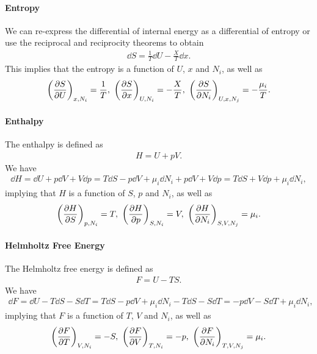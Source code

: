 \paragraph{Entropy}
We can re-express the differential of internal energy as a differential of entropy or use the reciprocal and reciprocity theorems to obtain
\begin{align*}
	\dd{S} = \frac{1}{T}\dd{U} - \frac{X}{T}\dd{x}.
\end{align*}
This implies that the entropy is a function of $U$, $x$ and $N_{i}$, as well as
\begin{align*}
	\left(\pdv{S}{U}\right)_{x, N_{i}} = \frac{1}{T},\ \left(\pdv{S}{x}\right)_{U, N_{i}} = -\frac{X}{T},\ \left(\pdv{S}{N_{i}}\right)_{U, x, N_{j}} = -\frac{\mu_{i}}{T}.
\end{align*}

\paragraph{Enthalpy}
The enthalpy is defined as 
\begin{align*}
	H = U + pV.
\end{align*}
We have
\begin{align*}
	\dd{H} = \dd{U} + p\dd{V} + V\dd{p} = T\dd{S} - p\dd{V} + \mu_{i}\dd{N_{i}} + p\dd{V} + V\dd{p} = T\dd{S} + V\dd{p} + \mu_{i}\dd{N_{i}},
\end{align*}
implying that $H$ is a function of $S$, $p$ and $N_{i}$, as well as
\begin{align*}
	\fix{\pdv{H}{S}}{p, N_{i}} = T,\ \fix{\pdv{H}{p}}{S, N_{i}} = V,\ \fix{\pdv{H}{N_{i}}}{S, V,  N_{j}} = \mu_{i}.
\end{align*}

\paragraph{Helmholtz Free Energy}
The Helmholtz free energy is defined as
\begin{align*}
	F = U - TS.
\end{align*}
We have
\begin{align*}
	\dd{F} = \dd{U} - T\dd{S} - S\dd{T} = T\dd{S} - p\dd{V} + \mu_{i}\dd{N_{i}} - T\dd{S} - S\dd{T} = -p\dd{V} - S\dd{T} + \mu_{i}\dd{N_{i}},
\end{align*}
implying that $F$ is a function of $T$, $V$ and $N_{i}$, as well as
\begin{align*}
	\fix{\pdv{F}{T}}{V, N_{i}} = -S,\ \fix{\pdv{F}{V}}{T, N_{i}} = -p,\ \fix{\pdv{F}{N_{i}}}{T, V,  N_{j}} = \mu_{i}.
\end{align*}

